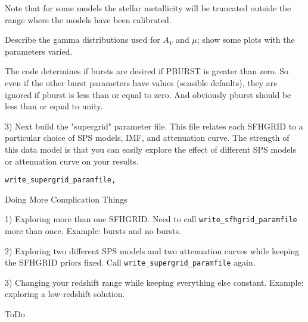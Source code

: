 \documentclass[12pt,preprint]{aastex}
\newcommand{\sfhpro}{{\tt write\_sfhgrid\_paramfile}}
\newcommand{\superpro}{{\tt write\_supergrid\_paramfile}}
\begin{document}
Note that for some models the stellar metallicity will be truncated
outside the range where the models have been calibrated.

Describe the gamma distributions used for $A_V$ and $\mu$; show some
plots with the parameters varied.

The code determines if bursts are desired if PBURST is greater than
zero.  So even if the other burst parameters have values (sensible
defaults), they are ignored if pburst is less than or equal to zero.
And obviously pburst should be less than or equal to unity.
  

3) Next build the "supergrid" parameter file.  This file relates each
SFHGRID to a particular choice of SPS models, IMF, and attenuation
curve.  The strength of this data model is that you can easily explore
the effect of different SPS models or attenuation curve on your
results.

\begin{verbatim}
write_supergrid_paramfile, 
\end{verbatim}


%   
%   


Doing More Complication Things

1) Exploring more than one SFHGRID.  Need to call \sfhpro{} more than
once.  Example: bursts and no bursts.

2) Exploring two different SPS models and two attenuation curves while
keeping the SFHGRID priors fixed.  Call \superpro{} again.

3) Changing your redshift range while keeping everything else
constant.  Example: exploring a low-redshift solution.


ToDo
\end{document}
